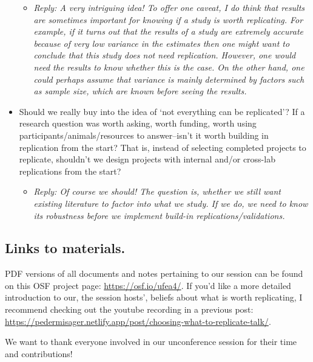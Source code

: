 \documentclass[
]{article}
\providecommand{\tightlist}{%
  \setlength{\itemsep}{0pt}\setlength{\parskip}{0pt}}
\begin{document}
\begin{itemize}
  \begin{itemize}
  \tightlist
  \item
    \emph{Reply: A very intriguing idea! To offer one caveat, I do think
    that results are sometimes important for knowing if a study is worth
    replicating. For example, if it turns out that the results of a
    study are extremely accurate because of very low variance in the
    estimates then one might want to conclude that this study does not
    need replication. However, one would need the results to know
    whether this is the case. On the other hand, one could perhaps
    assume that variance is mainly determined by factors such as sample
    size, which are known before seeing the results. }
  \end{itemize}
\item
  Should we really buy into the idea of `not everything can be
  replicated'? If a research question was worth asking, worth funding,
  worth using participants/animals/resources to answer--isn't it worth
  building in replication from the start? That is, instead of selecting
  completed projects to replicate, shouldn't we design projects with
  internal and/or cross-lab replications from the start?

  \begin{itemize}
  \tightlist
  \item
    \emph{Reply: Of course we should! The question is, whether we still
    want existing literature to factor into what we study. If we do, we
    need to know its robustness before we implement build-in
    replications/validations.}
  \end{itemize}
\end{itemize}

\hypertarget{links-to-materials.}{%
\subsection{Links to materials.}\label{links-to-materials.}}

PDF versions of all documents and notes pertaining to our session can be
found on this OSF project page: \url{https://osf.io/ufea4/}. If you'd
like a more detailed introduction to our, the session hosts', beliefs
about what is worth replicating, I recommend checking out the youtube
recording in a previous post:
\url{https://pedermisager.netlify.app/post/choosing-what-to-replicate-talk/}.

We want to thank everyone involved in our unconference session for their
time and contributions!
\end{document}
